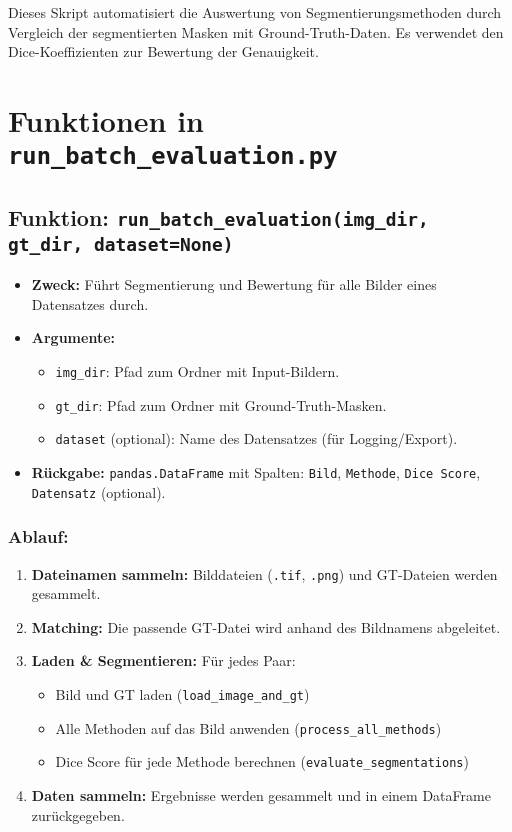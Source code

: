 \documentclass[a4paper,12pt]{article}
\begin{document}
Dieses Skript automatisiert die Auswertung von Segmentierungsmethoden durch Vergleich der segmentierten Masken mit Ground-Truth-Daten. Es verwendet den Dice-Koeffizienten zur Bewertung der Genauigkeit.

\section*{ Funktionen in \texttt{run\_batch\_evaluation.py}}

\subsection*{Funktion: \texttt{run\_batch\_evaluation(img\_dir, gt\_dir, dataset=None)}}

\begin{itemize}
  \item \textbf{Zweck:} Führt Segmentierung und Bewertung für alle Bilder eines Datensatzes durch.
  \item \textbf{Argumente:}
    \begin{itemize}
      \item \texttt{img\_dir}: Pfad zum Ordner mit Input-Bildern.
      \item \texttt{gt\_dir}: Pfad zum Ordner mit Ground-Truth-Masken.
      \item \texttt{dataset} (optional): Name des Datensatzes (für Logging/Export).
    \end{itemize}
  \item \textbf{Rückgabe:} \texttt{pandas.DataFrame} mit Spalten: \texttt{Bild}, \texttt{Methode}, \texttt{Dice Score}, \texttt{Datensatz} (optional).
\end{itemize}

\subsubsection*{Ablauf:}

\begin{enumerate}
  \item \textbf{Dateinamen sammeln:} Bilddateien (\texttt{.tif}, \texttt{.png}) und GT-Dateien werden gesammelt.
  \item \textbf{Matching:} Die passende GT-Datei wird anhand des Bildnamens abgeleitet.
  \item \textbf{Laden \& Segmentieren:} Für jedes Paar:
    \begin{itemize}
      \item Bild und GT laden (\texttt{load\_image\_and\_gt})
      \item Alle Methoden auf das Bild anwenden (\texttt{process\_all\_methods})
      \item Dice Score für jede Methode berechnen (\texttt{evaluate\_segmentations})
    \end{itemize}
  \item \textbf{Daten sammeln:} Ergebnisse werden gesammelt und in einem DataFrame zurückgegeben.
\end{enumerate}
\end{document}
